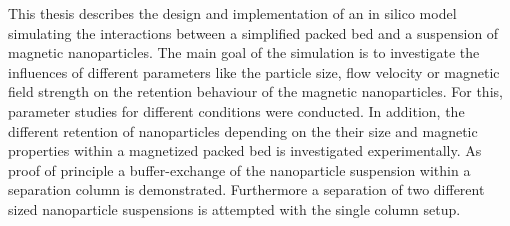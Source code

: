 This thesis describes the design and implementation of an in silico model simulating the interactions between a simplified packed bed and a suspension of magnetic nanoparticles. The main goal of the simulation is to investigate the influences of different parameters like the particle size, flow velocity or magnetic field strength on the retention behaviour of the magnetic nanoparticles. For this, parameter studies for different conditions were conducted. In addition, the different retention of nanoparticles depending on the their size and magnetic properties within a magnetized packed bed is investigated experimentally. As proof of principle a buffer-exchange of the nanoparticle suspension within a separation column is demonstrated. Furthermore a separation of two different sized nanoparticle suspensions is attempted with the single column setup.
